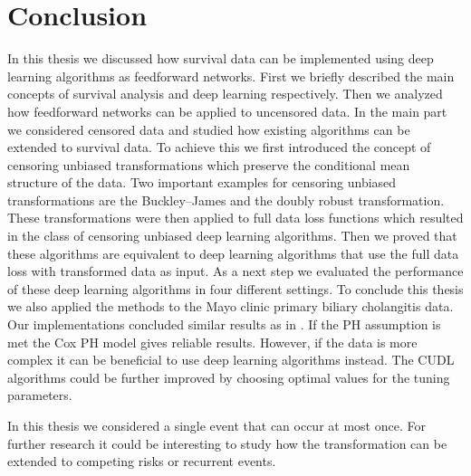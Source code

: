 \documentclass[12pt, a4paper]{scrartcl}
\theoremstyle{definition}
\theoremstyle{plain}
\numberwithin{equation}{section}
\numberwithin{figure}{section}
\numberwithin{table}{section}
\begin{document}
	\newpage
	
	\section{Conclusion}
	In this thesis we discussed how survival data can be implemented using deep learning algorithms as feedforward networks.
	First we briefly described the main concepts of survival analysis and deep learning respectively.
	Then we analyzed how feedforward networks can be applied to uncensored data.
	In the main part we considered censored data and studied how existing algorithms can be extended to survival data.
	To achieve this we first introduced the concept of censoring unbiased transformations which preserve the conditional mean structure of the data.
	Two important examples for censoring unbiased transformations are the Buckley--James and the doubly robust transformation.
	These transformations were then applied to full data loss functions which resulted in the class of censoring unbiased deep learning algorithms.
	Then we proved that these algorithms are equivalent to deep learning algorithms that use the full data loss with transformed data as input.
	As a next step we evaluated the performance of these deep learning algorithms in four different settings.
	To conclude this thesis we also applied the methods to the Mayo clinic primary biliary cholangitis data.
	Our implementations concluded similar results as in \citet*{basearticle}.
	If the PH assumption is met the Cox PH model gives reliable results.
	However, if the data is more complex it can be beneficial to use deep learning algorithms instead.
	The CUDL algorithms could be further improved by choosing optimal values for the tuning parameters.
	
	In this thesis we considered a single event that can occur at most once.
	For further research it could be interesting to study how the transformation can be extended to competing risks or recurrent events.
	
	\newpage
	
	\thispagestyle{empty}
	
	
	
	\newpage
	
\end{document}
